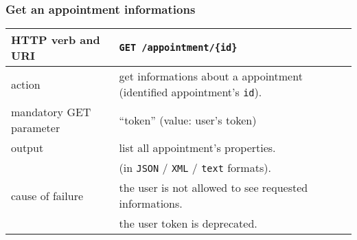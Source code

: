 \subsubsection{Get an appointment informations}
\begin{tabular}{ | l | l | }
	\hline
	HTTP verb and URI & \texttt{GET /appointment/\{id\}} \\
	\hline
	action & get informations about a appointment (identified \via appointment’s \texttt{id}). \\
	\hline
	mandatory GET parameter & ``token'' (value: user's token) \\
	\hline
	output & list all appointment's properties.  \\
	\space & (in \texttt{JSON} / \texttt{XML} / \texttt{text} formats). \\
	\hline
	cause of failure & the user is not allowed to see requested informations. \\
	\space & the user token is deprecated. \\
	\hline
\end{tabular}
\newline

